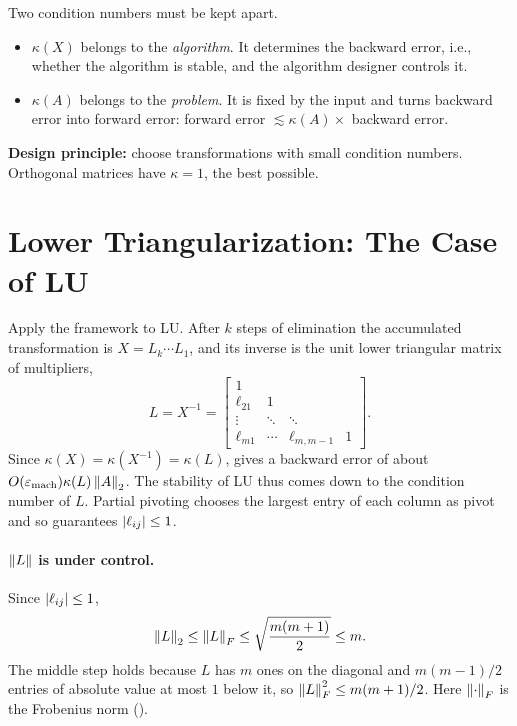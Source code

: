 Two condition numbers must be kept apart.
\begin{itemize}
  \item $\kappa(X)$ belongs to the \emph{algorithm}. It determines the backward error, i.e., whether the algorithm is stable, and the algorithm designer controls it.
  \item $\kappa(A)$ belongs to the \emph{problem}. It is fixed by the input and turns backward error into forward error: forward error $\lesssim \kappa(A) \times$ backward error.
\end{itemize}

\textbf{Design principle:} choose transformations with small condition numbers. Orthogonal matrices have $\kappa = 1$, the best possible.

\clearpage
\section{Lower Triangularization: The Case of LU}

Apply the framework to LU. After $k$ steps of elimination the accumulated transformation is $X = L_k \cdots L_1$, and its inverse is the unit lower triangular matrix of multipliers,
\begin{equation}
  L = X^{-1} = \begin{bmatrix} 1 & & & \\ \ell_{21} & 1 & & \\ \vdots & \ddots & \ddots & \\ \ell_{m1} & \cdots & \ell_{m,m-1} & 1 \end{bmatrix}.
\end{equation}
Since $\kappa(X) = \kappa(X^{-1}) = \kappa(L)$,  gives a backward error of about $O(\varepsilon_{\mathrm{mach}})\kappa(L)\left\lVert A \right\rVert_2$. The stability of LU thus comes down to the condition number of $L$. Partial pivoting chooses the largest entry of each column as pivot and so guarantees $\left\lvert \ell_{ij} \right\rvert \le 1$.

\paragraph{$\left\lVert L \right\rVert$ is under control.} Since $\left\lvert \ell_{ij} \right\rvert \le 1$,
\begin{equation}
  \left\lVert L \right\rVert_2 \le \left\lVert L \right\rVert_F \le \sqrt{\frac{m(m+1)}{2}} \le m.
\end{equation}
The middle step holds because $L$ has $m$ ones on the diagonal and $m(m-1)/2$ entries of absolute value at most $1$ below it, so $\left\lVert L \right\rVert_F^2 \le m(m+1)/2$. Here $\left\lVert \cdot \right\rVert_F$ is the Frobenius norm ().

